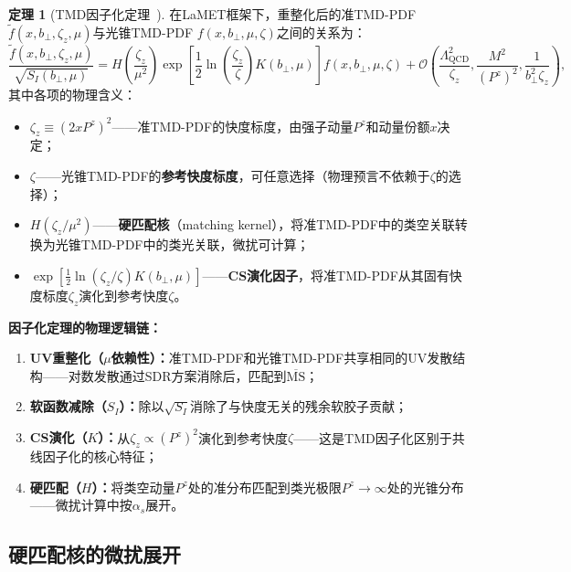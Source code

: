\documentclass[12pt,a4paper]{ctexart}
\theoremstyle{definition}
\newtheorem{theorem}{定理}[section]
\begin{document}
\begin{theorem}[TMD因子化定理~\cite{Izubuchi2018,He2024unpolTMD,Ji2014LaMET}]
在LaMET框架下，重整化后的准TMD-PDF $\tilde{f}(x, b_\perp, \zeta_z, \mu)$与光锥TMD-PDF $f(x, b_\perp, \mu, \zeta)$之间的关系为：
\begin{equation}
\boxed{\frac{\tilde{f}(x, b_\perp, \zeta_z, \mu)}{\sqrt{S_I(b_\perp, \mu)}} = H\!\left(\frac{\zeta_z}{\mu^2}\right) \exp\!\left[ \frac{1}{2} \ln\!\left(\frac{\zeta_z}{\zeta}\right) K(b_\perp, \mu) \right] f(x, b_\perp, \mu, \zeta) + \mathcal{O}\!\left(\frac{\Lambda^2_{\text{QCD}}}{\zeta_z}, \frac{M^2}{(P^z)^2}, \frac{1}{b_\perp^2 \zeta_z}\right)},
\label{eq:full_factorization}
\end{equation}
其中各项的物理含义：
\begin{itemize}
    \item $\zeta_z \equiv (2xP^z)^2$——准TMD-PDF的快度标度，由强子动量$P^z$和动量份额$x$决定；
    \item $\zeta$——光锥TMD-PDF的\textbf{参考快度标度}，可任意选择（物理预言不依赖于$\zeta$的选择）；
    \item $H(\zeta_z/\mu^2)$——\textbf{硬匹配核}（matching kernel），将准TMD-PDF中的类空关联转换为光锥TMD-PDF中的类光关联，微扰可计算；
    \item $\exp[\frac{1}{2}\ln(\zeta_z/\zeta)K(b_\perp,\mu)]$——\textbf{CS演化因子}，将准TMD-PDF从其固有快度标度$\zeta_z$演化到参考快度$\zeta$。
\end{itemize}
\end{theorem}

\textbf{因子化定理的物理逻辑链：}
\begin{enumerate}
    \item \textbf{UV重整化（$\mu$依赖性）：}准TMD-PDF和光锥TMD-PDF共享相同的UV发散结构——对数发散通过SDR方案消除后，匹配到$\overline{\text{MS}}$；
    \item \textbf{软函数减除（$S_I$）：}除以$\sqrt{S_I}$消除了与快度无关的残余软胶子贡献；
    \item \textbf{CS演化（$K$）：}从$\zeta_z \propto (P^z)^2$演化到参考快度$\zeta$——这是TMD因子化区别于共线因子化的核心特征；
    \item \textbf{硬匹配（$H$）：}将类空动量$P^z$处的准分布匹配到类光极限$P^z \to \infty$处的光锥分布——微扰计算中按$\alpha_s$展开。
\end{enumerate}

\subsection{硬匹配核的微扰展开}
\end{document}
